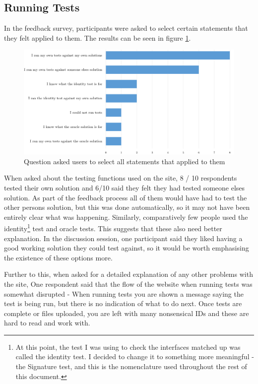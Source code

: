 \documentclass[a4paper,11pt]{report}
\begin{document}
\subsection{Running Tests}
In the feedback survey, participants were asked to select certain statements that they felt applied to them. The results can be seen in figure \ref{fig:stmt-test}.\par
\begin{figure}[ht]
\includegraphics[width=\textwidth]{eva-result/stmt-tests.png}
\caption{Question asked users to select all statements that applied to them}
\label{fig:stmt-test}
\end{figure}
When asked about the testing functions used on the site, 8 / 10 respondents tested their own solution and 6/10 said they felt they had tested someone elses solution. As part of the feedback process all of them would have had to test the other persons solution, but this was done automatically, so it may not have been entirely clear what was happening. Similarly, comparatively few people used the identity\footnote{At this point, the test I was using to check the interfaces matched up was called the identity test. I decided to change it to something more meaningful - the Signature test, and this is the nomenclature used throughout the rest of this document.} test and oracle tests. This suggests that these also need better explanation. In the discussion session, one participant said they liked having a good working solution they could test against, so it would be worth emphasising the existence of these options more.\par
Further to this, when asked for a detailed explanation of any other problems with the site, One respondent said that the flow of the website when running tests was somewhat disrupted - When running tests you are shown a message saying the test is being run, but there is no indication of what to do next. Once tests are complete or files uploaded, you are left with many nonsensical IDs and these are hard to read and work with.
\end{document}

